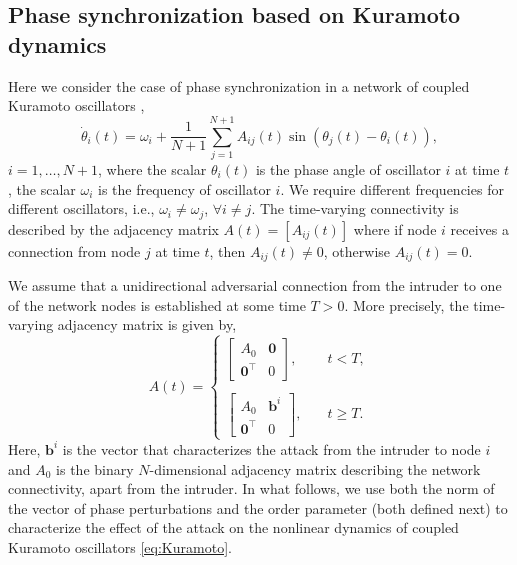 \documentclass[%
 reprint,
 amsmath,amssymb,
 aip,
]{revtex4-2}
\def \bb {\pmb{b}}
\theoremstyle{italichead}
\theoremstyle{definition}
\begin{document}
{\subsection{Phase synchronization based on Kuramoto dynamics}

Here we consider the case of phase synchronization in a network of coupled Kuramoto oscillators \cite{KuraBOOK},
\begin{equation} \label{eq:Kuramoto}
    \dot{\theta}_i (t) = \omega_i +\dfrac{1}{N+1} \sum_{j=1}^{N+1} A_{ij} (t) \sin(\theta_j (t) - \theta_i (t)),
\end{equation}
$i = 1,\hdots, N+1$, where the scalar $\theta_i (t)$ is the phase angle of oscillator $i$ at time $t$, the scalar $\omega_i$ is the frequency of  oscillator $i$. 
We require different frequencies for different oscillators, i.e., $\omega_i \neq \omega_j$, $\forall i \neq j$.
The time-varying connectivity is described by the adjacency matrix $A(t) = [A_{ij}(t)]$ where if node $i$ receives a connection from node $j$ at time $t$, then $A_{ij}(t) \neq 0$, otherwise $A_{ij}(t) = 0$.

We assume that a unidirectional adversarial connection from the intruder to one of the network nodes is  
established at some time $T > 0$. 
More precisely, the time-varying adjacency matrix is given by,
\begin{equation} \label{eq:Akuramoto}
    A(t) = \begin{cases}
        \begin{bmatrix}
            A_0 & \pmb{0} \\
            \pmb{0}^\top & 0
        \end{bmatrix}, \quad & t < T, \\
        \\
        \begin{bmatrix}
            A_0 & \bb^i \\
            \pmb{0}^\top & 0
        \end{bmatrix}, \quad & t \geq T.
    \end{cases}
\end{equation}
Here, $\bb^i$ is the vector that characterizes the attack from the intruder to node $i$ and $A_0$ is the binary $N$-dimensional  adjacency matrix describing the network connectivity, apart from the intruder.
In what follows, we use both the norm of the vector of phase perturbations and the order parameter (both defined next) to
characterize the effect of the attack on the nonlinear dynamics of coupled Kuramoto oscillators \eqref{eq:Kuramoto}.

}
\end{document}
